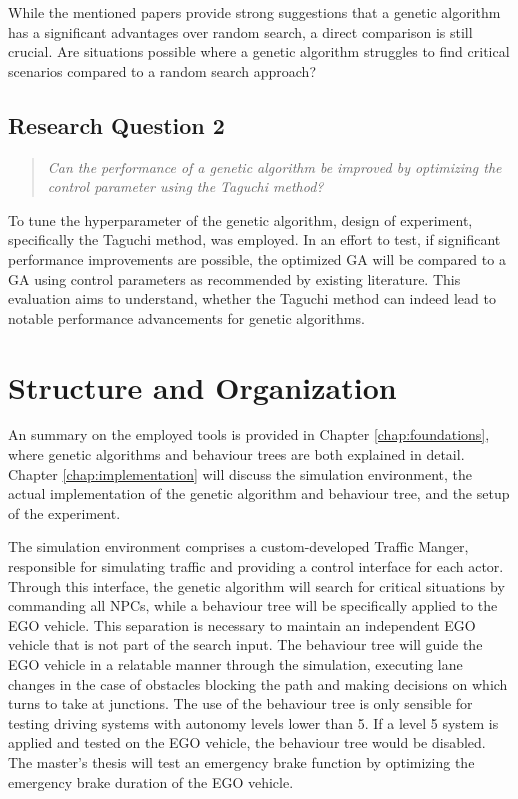 While the mentioned papers provide strong suggestions that a genetic algorithm has a significant advantages over random search, a direct comparison is still crucial. Are situations possible where a genetic algorithm struggles to find critical scenarios compared to a random search approach?

\subsection{Research Question 2}
\begin{quote}
	\begin{em}
		\textit{Can the performance of a genetic algorithm be improved by optimizing the control parameter using the Taguchi method?}
	\end{em}
\end{quote}

To tune the hyperparameter of the genetic algorithm, design of experiment, specifically the Taguchi method, was employed. In an effort to test, if significant performance improvements are possible, the optimized GA will be compared to a GA using control parameters as recommended by existing literature. This evaluation aims to understand, whether  the Taguchi method can indeed lead to notable performance advancements for genetic algorithms.


\section{Structure and Organization}
An summary on the employed tools is provided in Chapter \ref{chap:foundations}, where genetic algorithms and behaviour trees are both explained in detail. Chapter \ref{chap:implementation} will discuss the simulation environment, the actual implementation of the genetic algorithm and behaviour tree, and the setup of the experiment. 

The simulation environment comprises a custom-developed Traffic Manger, responsible for simulating traffic and providing a control interface for each actor. Through this interface, the genetic algorithm will search for critical situations by commanding all NPCs, while a behaviour tree will be specifically applied to the EGO vehicle. This separation is necessary to maintain an independent EGO vehicle that is not part of the search input. The behaviour tree will guide the EGO vehicle in a relatable manner through the simulation, executing lane changes in the case of obstacles blocking the path and making decisions on which turns to take at junctions. The use of the behaviour tree is only sensible for testing driving systems with autonomy levels lower than 5. If a level 5 system is applied and tested on the EGO vehicle, the behaviour tree would be disabled. The master's thesis will test an emergency brake function by optimizing the emergency brake duration of the EGO vehicle.


